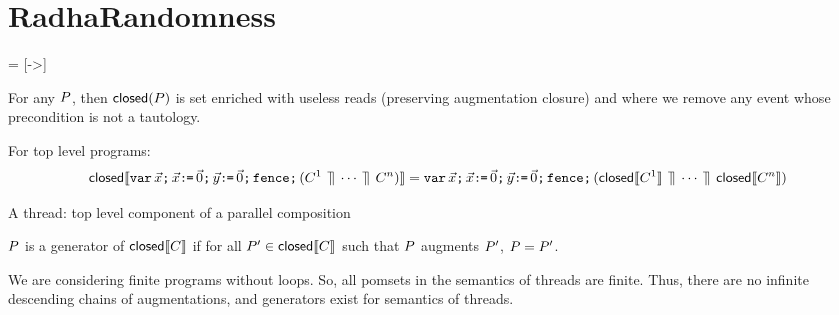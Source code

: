 \section{RadhaRandomness}

\newcommand{\acylic}{\mathit{acyclic}}
\newcommand{\pomspace}{{\cal P}}

 = [->]
\newcommand{\feco}{\mathit{eco}}
\newcommand{\reco}{\ensuremath{\mathrel{\mathsf{eco}}}}%
\newcommand{\xeco}{\xarrowtikz{eco}{eco}}

\newcommand{\reads}{\mathit{Reads}}
\newcommand{\Seq}{{\tt Sequential}}

\newcommand{\writes}{\mathit{Writes}}
\newcommand{\pomf}[1]{Fun_{#1}}
\newcommand{\pomFn}{\mathit{PomFn}}
\newcommand{\power}{\mathcal{P}}
\newcommand{\aFn}{F}
\newcommand{\aRSet}{R}
\newcommand{\bRSet}{S}
\newcommand{\aWSet}{U}
\newcommand{\bWSet}{V}
\newcommand{\aWrite}{\aAct_w}
\newcommand{\bPS}{\aPS'}
\newcommand{\cPS}{\aPS_1}
\newcommand{\dPS}{\aPS'_1}
\newcommand{\after}{\mathrel{\mathsf{after}}}
\newcommand{\size}{\mathsf{size}}

\newcommand{\test}[1]{\overline{#1}}
\newcommand{\testP}[2]{{\tt test}^{#1}_{#2}}
\newcommand{\hole}[1]{[#1]}
\newcommand{\freshaval}{\aVal_{{\tt fr}}}


For any $P$, then $\textsf{closed}(P)$ is set enriched with useless reads
(preserving augmentation closure) and where we remove any event whose
precondition is not a tautology.

For top level programs:
\begin{displaymath}
  \textsf{closed}\llbracket\texttt{var}\,\vec{x}\texttt{;}\,
    \vec{x}\texttt{:}\mkern-1mu\texttt{=}\,\vec{0}\texttt{;}\,
    \vec{y}\texttt{:}\mkern-1mu\texttt{=}\,\vec{0}\texttt{;}\,
    \texttt{fence}\texttt{;}\,
    (C^1 \,\mathbin{\rrceil}\, \cdots \,\mathbin{\rrceil}\, C^n)\rrbracket
  =
  \texttt{var}\,\vec{x}\texttt{;}\,
    \vec{x}\texttt{:}\mkern-1mu\texttt{=}\,\vec{0}\texttt{;}\,
    \vec{y}\texttt{:}\mkern-1mu\texttt{=}\,\vec{0}\texttt{;}\,
    \texttt{fence}\texttt{;}\,
    (\textsf{closed}\llbracket C^1\rrbracket \,\mathbin{\rrceil}\, \cdots \,\mathbin{\rrceil}\, \textsf{closed}\llbracket C^n\rrbracket)
\end{displaymath}

\begin{definition}
A thread: top level component of a parallel composition
\end{definition}

\begin{definition}
$P$ is a generator of  $\textsf{closed}\llbracket C\rrbracket$ if for all $\bPS \in \semClosed{\aCmd}$ such that $P$ augments $\bPS$, $\aPS = \bPS$.
\end{definition}

We are considering finite programs without loops.  So,  all pomsets in the semantics of threads are finite.  Thus, there are no infinite descending chains of augmentations, and  generators exist for semantics of threads.

